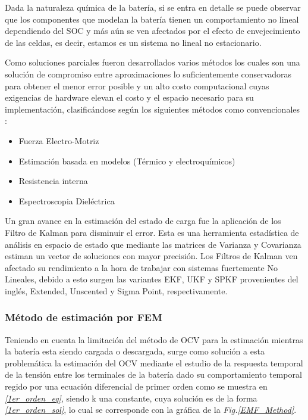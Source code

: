 \documentclass[10pt,a4paper]{article}
\begin{document}
	Dada la naturaleza química de la batería, si se entra en detalle se puede observar que los componentes que modelan la batería tienen un comportamiento no lineal dependiendo del \acrshort{SOC} y más aún se ven afectados por el efecto de envejecimiento de las celdas, es decir, estamos es un sistema no lineal no estacionario.

	Como soluciones parciales fueron desarrollados varios métodos los cuales son una solución de compromiso entre aproximaciones lo suficientemente conservadoras para obtener el menor error posible y un alto costo computacional cuyas exigencias de hardware elevan el costo y el espacio necesario para su implementación, clasificándose según \cite{Hannan2017} los siguientes métodos como convencionales :

	\begin{itemize}
		\item Fuerza Electro-Motriz
		\item Estimación basada en modelos (Térmico y electroquímicos)
		\item Resistencia interna
		\item Espectroscopia Dieléctrica
	\end{itemize}
	
	Un gran avance en la estimación del estado de carga fue la aplicación de los Filtro de Kalman para disminuir el error. Esta es una herramienta estadística de análisis en espacio de estado que mediante las matrices de Varianza y Covarianza estiman un vector de soluciones con mayor precisión. 
	Los Filtros de Kalman ven afectado su rendimiento a la hora de trabajar con sistemas fuertemente No Lineales, debido a esto surgen las variantes EKF, UKF y SPKF provenientes del inglés, Extended, Unscented y Sigma Point, respectivamente.
	
	\subsubsection{Método de estimación por FEM}

	Teniendo en cuenta la limitación del método de \acrshort{OCV} para la estimación mientras la batería esta siendo cargada o descargada, surge como solución a esta problemática la estimación del \acrshort{OCV} mediante el estudio de la respuesta temporal de la tensión entre los terminales de la batería dado su comportamiento temporal regido por una ecuación diferencial de primer orden como se muestra en \emph{\ref{1er_orden_eq}}, siendo k una constante, cuya solución es de la forma \emph{\ref{1er_orden_sol}}, lo cual se corresponde con la gráfica de la \emph{Fig.\ref{EMF_Method}}.
	
\end{document}
